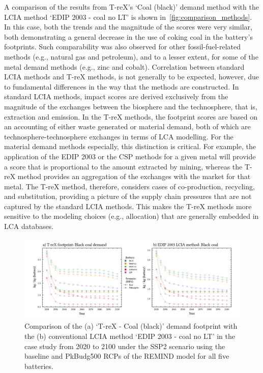 A comparison of the results from T-reX's `Coal (black)' demand method with the LCIA method `EDIP 2003 - coal no LT' is shown in~\autoref{fig:comparison_methods}. In this case, both the trends and the magnitude of the scores were very similar, both demonstrating a general decrease in the use of coking coal in the battery's footprints. Such comparability was also observed for other fossil-fuel-related methods (e.g., natural gas and petroleum), and to a lesser extent, for some of the metal demand methods (e.g., zinc and cobalt). Correlation between standard LCIA methods and T-reX methods, is not generally to be expected, however, due to fundamental differences in the way that the methods are constructed. In standard LCIA methods, impact scores are derived exclusively from the magnitude of the exchanges between the biosphere and the technosphere, that is, extraction and emission. In the T-reX methods, the footprint scores are based on an accounting of either waste generated or material demand, both of which are technosphere-technosphere exchanges in terms of LCA modelling. For the material demand methods especially, this distinction is critical. For example, the application of the EDIP 2003 or the CSP methods for a given metal will provide a score that is proportional to the amount extracted by mining, whereas the T-reX method provides an aggregation of the exchanges with the market for that metal. The T-reX method, therefore, considers cases of co-production, recycling, and substitution, providing a picture of the supply chain pressures that are not captured by the standard LCIA methods. This makes the T-reX methods more sensitive to the modeling choices (e.g., allocation) that are generally embedded in LCA databases.

\begin{figure}[H]
\centering
\includegraphics[width=18cm]{figures/T-reX-coalANDedip.pdf}
\caption{Comparison of the (a) `T-reX - Coal (black)' demand footprint with the (b) conventional LCIA method `EDIP 2003 - coal no LT'  in the case study from 2020 to 2100 under the SSP2 scenario using the baseline and PkBudg500 RCPs of the REMIND model for all five batteries.}\label{fig:comparison_methods}
\end{figure}

